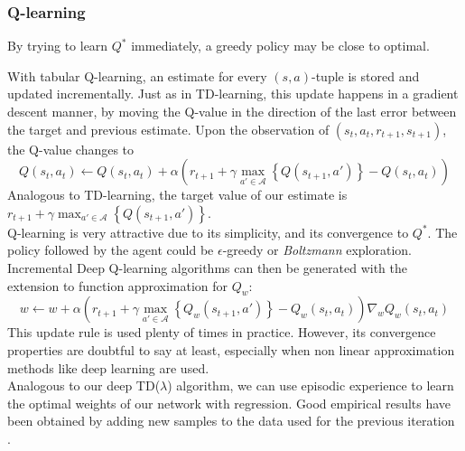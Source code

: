 \subsubsection{Q-learning}
By trying to learn $Q^*$ immediately, a greedy policy may be close to optimal.

With tabular Q-learning, an estimate for every $(s,a)$-tuple is stored and updated incrementally. Just as in TD-learning, this update happens in a gradient descent manner, by moving the Q-value in the direction of the last error between the target and previous estimate. Upon the observation of $(s_t,a_t,r_{t+1},s_{t+1})$, the Q-value changes to
\begin{equation}
Q(s_t,a_t) \leftarrow Q(s_t,a_t)+\alpha \left(r_{t+1}+\gamma \max_{a' \in \mathcal{A}} \left\{ Q(s_{t+1},a')\right\}-Q(s_t,a_t)\right)
\end{equation}
Analogous to TD-learning, the target value of our estimate is $r_{t+1}+\gamma \max_{a' \in \mathcal{A}} \left\{ Q(s_{t+1},a')\right\}$. \\
Q-learning is very attractive due to its simplicity, and its convergence to $Q^*$. The policy followed by the agent could be $\epsilon$-greedy or \textit{Boltzmann} exploration. \\
Incremental Deep Q-learning algorithms can then be generated with the extension to function approximation for $Q_w$:
\begin{equation}
w \leftarrow w+\alpha \left(r_{t+1}+\gamma \max_{a' \in \mathcal{A}} \left\{ Q_w(s_{t+1},a')\right\}-Q_w(s_t,a_t)\right) \nabla_w Q_w(s_t,a_t)
\end{equation}
This update rule is used plenty of times in practice. However, its convergence properties are doubtful to say at least, especially when non linear approximation methods like deep learning are used. \\

Analogous to our deep TD($\lambda$) algorithm, we can use episodic experience to learn the optimal weights of our network with regression. Good empirical results have been obtained by adding new samples to the data used for the previous iteration \cite{ried05}.

